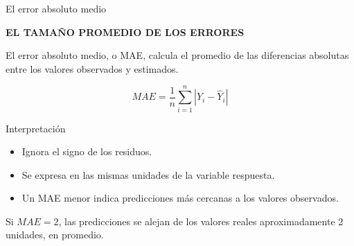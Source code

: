 \documentclass[aspectratio=169,11pt]{beamer}
\newcommand{\kicker}[1]{%
  {\scriptsize\bfseries\color{cAcc}\MakeUppercase{#1}}%
  \par\vspace{0.2em}%
}
\newenvironment{cerrado}[1]
  {\begin{block}{#1}
   \begin{minipage}{\linewidth}
   \raggedright}
  {\end{minipage}
   \end{block}}
\begin{document}
\begin{frame}{El error absoluto medio}

  \begin{center}
    \begin{minipage}{0.84\textwidth}

      \kicker{EL TAMAÑO PROMEDIO DE LOS ERRORES}

      El error absoluto medio, o MAE, calcula el promedio de las
      diferencias absolutas entre los valores observados y estimados.

      \[
        MAE
        =
        \frac{1}{n}
        \sum_{i=1}^{n}
        |Y_i-\hat{Y}_i|
      \]

      \begin{cerrado}{Interpretación}

        \begin{itemize}
          \setlength{\itemsep}{0.25em}

          \item Ignora el signo de los residuos.

          \item Se expresa en las mismas unidades de la variable respuesta.

          \item Un MAE menor indica predicciones más cercanas a los
          valores observados.

        \end{itemize}

        Si \(MAE=2\), las predicciones se alejan de los valores reales
        aproximadamente 2 unidades, en promedio.

      \end{cerrado}

    \end{minipage}
  \end{center}

\end{frame}
\end{document}
